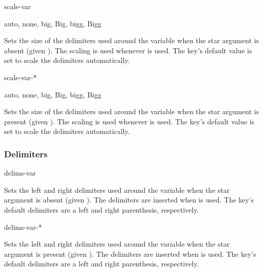 	\begin{option}{scale-var}
		\begin{values}[default = auto]
			auto, none, big, Big, bigg, Bigg
		\end{values}
		Sets the size of the delimiters used around the variable when the star argument is absent (given ). The scaling is used whenever  is used. The key's default value is set to scale the delimiters automatically.
	\end{option}
	
	\begin{option}{scale-var-*}
		\begin{values}[default = auto]
			auto, none, big, Big, bigg, Bigg
		\end{values}
		Sets the size of the delimiters used around the variable when the star argument is present (given ). The scaling is used whenever  is used. The key's default value is set to scale the delimiters automatically.
	\end{option}
	
	\subsubsection*{Delimiters}
	
	\begin{option}{delims-var}
		\begin{values}[default = (~)]
		\end{values}
		Sets the left and right delimiters used around the variable when the star argument is absent (given ). The delimiters are inserted when  is used. The key's default delimiters are a left and right parenthesis, respectively.
	\end{option}
	
	\begin{option}{delims-var-*}
		\begin{values}[default = (~)]
		\end{values}
		Sets the left and right delimiters used around the variable when the star argument is present (given ). The delimiters are inserted when  is used. The key's default delimiters are a left and right parenthesis, respectively.
	\end{option}
	
